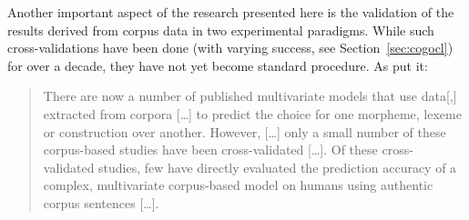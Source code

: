 Another important aspect of the research presented here is the validation of the results derived from corpus data in two experimental paradigms.
While such cross-validations have been done (with varying success, see Section~\ref{sec:cogocl}) for over a decade, they have not yet become standard procedure.
As \citet[3--4]{DivjakEa2016a} put it:

\begin{quote}
  There are now a number of published multivariate models that use data[,] extracted from corpora [\ldots] to predict the choice for one morpheme, lexeme or construction over another.
  However, [\ldots] only a small number of these corpus-based studies have been cross-validated [\ldots].
  Of these cross- validated studies, few have directly evaluated the prediction accuracy of a complex, multivariate corpus-based model on humans using authentic corpus sentences [\ldots].
\end{quote}

